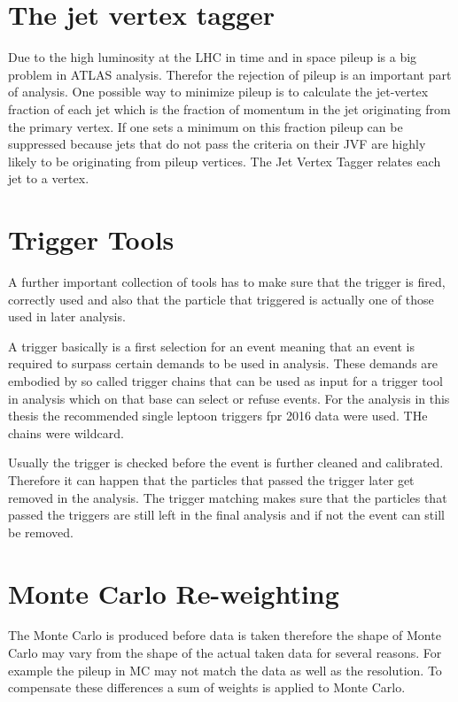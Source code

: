\section{The jet vertex tagger}

Due to the high luminosity at the LHC in time and in space pileup is a big problem in ATLAS analysis. Therefor the rejection of pileup is an important part of analysis. One possible way to minimize pileup is to calculate the jet-vertex fraction of each jet which is the fraction of momentum in the jet originating from the primary vertex. If one sets a minimum on this fraction pileup can be suppressed because jets that do not pass the criteria on their JVF are highly likely to be originating from pileup vertices. The Jet Vertex Tagger relates each jet to a vertex.

\section{Trigger Tools}

A further important collection of tools has to make sure that the trigger is fired, correctly used and also that the particle that triggered is actually one of those used in later analysis.

A trigger basically is a first selection for an event meaning that an event is required to surpass certain demands to be used in analysis. These demands are embodied by so called trigger chains that can be used as input for a trigger tool in analysis which on that base can select or refuse events. For the analysis in this thesis the recommended single leptoon triggers fpr 2016 data were used. THe chains were wildcard.

Usually the trigger is checked before the event is further cleaned and calibrated. Therefore it can happen that the particles that passed the trigger later get removed in the analysis. The trigger matching makes sure that the particles that passed the triggers are still left in the final analysis and if not the event can still be removed.

\section{Monte Carlo Re-weighting}

The Monte Carlo is produced before data is taken therefore the shape of Monte Carlo may vary from the shape of the actual taken data for several reasons. For example the pileup in MC may not match the data as well as the resolution. To compensate these differences a sum of weights is applied to Monte Carlo.


